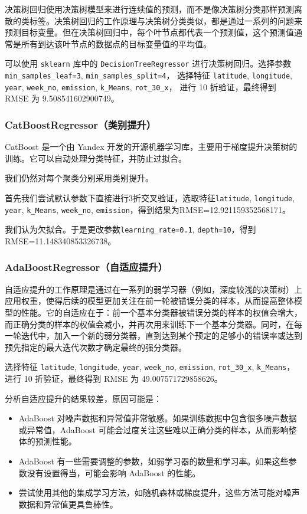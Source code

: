 \documentclass{ctexart}
\begin{document}
\begin{sloppypar}
决策树回归使用决策树模型来进行连续值的预测，而不是像决策树分类那样预测离散的类标签。决策树回归的工作原理与决策树分类类似，都是通过一系列的问题来预测目标变量。但在决策树回归中，每个叶节点都代表一个预测值，这个预测值通常是所有到达该叶节点的数据点的目标变量值的平均值。

可以使用 \texttt{sklearn} 库中的 \texttt{DecisionTreeRegressor} 进行决策树回归。选择参数
\texttt{min\_samples\_leaf=3}, \texttt{min\_samples\_split=4}，
选择特征 \texttt{latitude}, \texttt{longitude}, \texttt{year}, \texttt{week\_no}, \texttt{emission}, \texttt{k\_Means}, \texttt{rot\_30\_x}，
进行 10 折验证，最终得到 RMSE 为 9.508541602900749。

\subsubsection{CatBoostRegressor（类别提升）}

CatBoost 是一个由 Yandex 开发的开源机器学习库，主要用于梯度提升决策树的训练。它可以自动处理分类特征，并防止过拟合。

我们仍然对每个聚类分别采用类别提升。

首先我们尝试默认参数下直接进行3折交叉验证，选取特征\texttt{latitude}, \texttt{longitude}, \texttt{year}, \texttt{k\_Means}, \texttt{week\_no}, \texttt{emission}，得到结果为RMSE=12.921159352568171。

我们认为欠拟合。于是更改参数\texttt{learning\_rate=0.1}, \texttt{depth=10}，得到RMSE=11.148340853326738。

\subsubsection{AdaBoostRegressor（自适应提升）}

自适应提升的工作原理是通过在一系列的弱学习器（例如，深度较浅的决策树）上应用权重，使得后续的模型更加关注在前一轮被错误分类的样本，从而提高整体模型的性能。它的自适应在于：前一个基本分类器被错误分类的样本的权值会增大，而正确分类的样本的权值会减小，并再次用来训练下一个基本分类器。同时，在每一轮迭代中，加入一个新的弱分类器，直到达到某个预定的足够小的错误率或达到预先指定的最大迭代次数才确定最终的强分类器。

选择特征 \texttt{latitude}, \texttt{longitude}, \texttt{year}, \texttt{week\_no}, \texttt{emission}, \texttt{rot\_30\_x}, \texttt{k\_Means}，进行 10 折验证，最终得到 RMSE 为 49.007571729858626。

分析自适应提升的结果较差，原因可能是：

\begin{itemize}
      \item AdaBoost 对噪声数据和异常值非常敏感。如果训练数据中包含很多噪声数据或异常值，AdaBoost 可能会过度关注这些难以正确分类的样本，从而影响整体的预测性能。
      \item AdaBoost 有一些需要调整的参数，如弱学习器的数量和学习率。如果这些参数没有设置得当，可能会影响 AdaBoost 的性能。
      \item 尝试使用其他的集成学习方法，如随机森林或梯度提升，这些方法可能对噪声数据和异常值更具鲁棒性。
\end{itemize}


\end{sloppypar}
\end{document}
